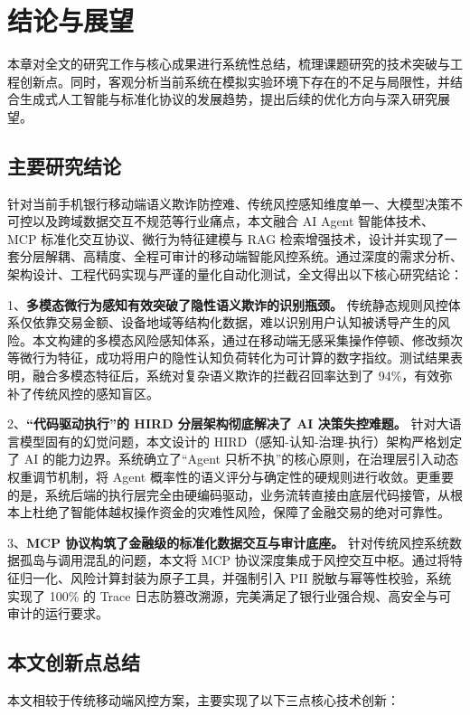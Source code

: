 \documentclass[twoside,openright]{xduugthesis}
\begin{document}
\chapter{结论与展望}

本章对全文的研究工作与核心成果进行系统性总结，梳理课题研究的技术突破与工程创新点。同时，客观分析当前系统在模拟实验环境下存在的不足与局限性，并结合生成式人工智能与标准化协议的发展趋势，提出后续的优化方向与深入研究展望。

\section{主要研究结论}

针对当前手机银行移动端语义欺诈防控难、传统风控感知维度单一、大模型决策不可控以及跨域数据交互不规范等行业痛点，本文融合 AI Agent 智能体技术、MCP 标准化交互协议、微行为特征建模与 RAG 检索增强技术，设计并实现了一套分层解耦、高精度、全程可审计的移动端智能风控系统。通过深度的需求分析、架构设计、工程代码实现与严谨的量化自动化测试，全文得出以下核心研究结论：

1、\textbf{多模态微行为感知有效突破了隐性语义欺诈的识别瓶颈。} 传统静态规则风控体系仅依靠交易金额、设备地域等结构化数据，难以识别用户认知被诱导产生的风险。本文构建的多模态风险感知体系，通过在移动端无感采集操作停顿、修改频次等微行为特征，成功将用户的隐性认知负荷转化为可计算的数字指纹。测试结果表明，融合多模态特征后，系统对复杂语义欺诈的拦截召回率达到了 94\%，有效弥补了传统风控的感知盲区。

2、\textbf{“代码驱动执行”的 HIRD 分层架构彻底解决了 AI 决策失控难题。} 针对大语言模型固有的幻觉问题，本文设计的 HIRD（感知-认知-治理-执行）架构严格划定了 AI 的能力边界。系统确立了“Agent 只析不执”的核心原则，在治理层引入动态权重调节机制，将 Agent 概率性的语义评分与确定性的硬规则进行收敛。更重要的是，系统后端的执行层完全由硬编码驱动，业务流转直接由底层代码接管，从根本上杜绝了智能体越权操作资金的灾难性风险，保障了金融交易的绝对可靠性。

3、\textbf{MCP 协议构筑了金融级的标准化数据交互与审计底座。} 针对传统风控系统数据孤岛与调用混乱的问题，本文将 MCP 协议深度集成于风控交互中枢。通过将特征归一化、风险计算封装为原子工具，并强制引入 PII 脱敏与幂等性校验，系统实现了 100\% 的 Trace 日志防篡改溯源，完美满足了银行业强合规、高安全与可审计的运行要求。

\section{本文创新点总结}

本文相较于传统移动端风控方案，主要实现了以下三点核心技术创新：
\end{document}

